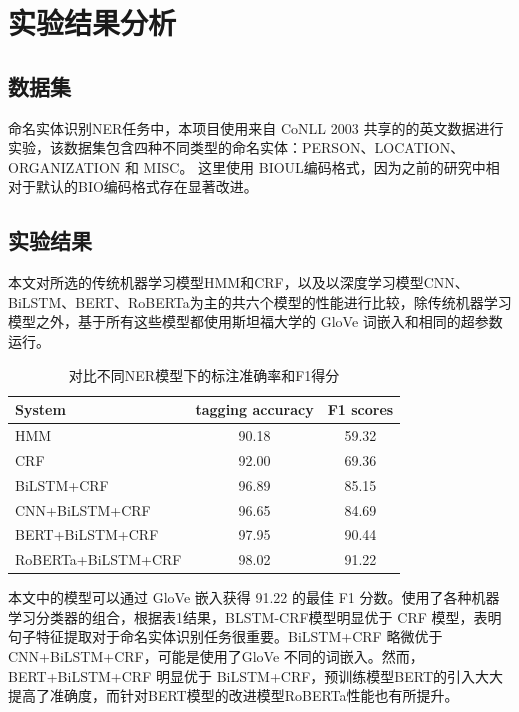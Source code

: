 \documentclass[a4paper, 12pt]{article}
\begin{document}
\section{实验结果分析} %
\label{sec:analysis}

\subsection{数据集} %
\label{sub:dataset}
命名实体识别NER任务中，本项目使用来自 CoNLL 2003 共享的的英文数据进行实验，该数据集包含四种不同类型的命名实体：PERSON、LOCATION、ORGANIZATION 和 MISC。 这里使用 BIOUL编码格式，因为之前的研究中相对于默认的BIO编码格式存在显著改进。

\subsection{实验结果} %
\label{sub:res}

本文对所选的传统机器学习模型HMM和CRF，以及以深度学习模型CNN、BiLSTM、BERT、RoBERTa为主的共六个模型的性能进行比较，除传统机器学习模型之外，基于所有这些模型都使用斯坦福大学的 GloVe 词嵌入和相同的超参数运行。

\begin{table}[htbp]
    \begin{center}
    \large 
    \begin{tabular}{lcc}
        \hline
         System & tagging accuracy & F1 scores \\   
        \hline
        
         HMM                &       90.18 & 59.32          \\
         CRF                &       92.00 & 69.36          \\
         BiLSTM+CRF         &       96.89 & 85.15        \\
         CNN+BiLSTM+CRF     &       96.65 & 84.69          \\
         BERT+BiLSTM+CRF    &       97.95 & 90.44         \\
         RoBERTa+BiLSTM+CRF &       98.02 & 91.22      \\
        \hline
    \end{tabular}
    \end{center}
    \caption {对比不同NER模型下的标注准确率和F1得分} 
\end{table}

本文中的模型可以通过 GloVe 嵌入获得 91.22 的最佳 F1 分数。使用了各种机器学习分类器的组合，根据表1结果，BLSTM-CRF模型明显优于 CRF 模型，表明句子特征提取对于命名实体识别任务很重要。BiLSTM+CRF 略微优于 CNN+BiLSTM+CRF，可能是使用了GloVe 不同的词嵌入。然而，BERT+BiLSTM+CRF 明显优于 BiLSTM+CRF，预训练模型BERT的引入大大提高了准确度，而针对BERT模型的改进模型RoBERTa性能也有所提升。
\end{document}
